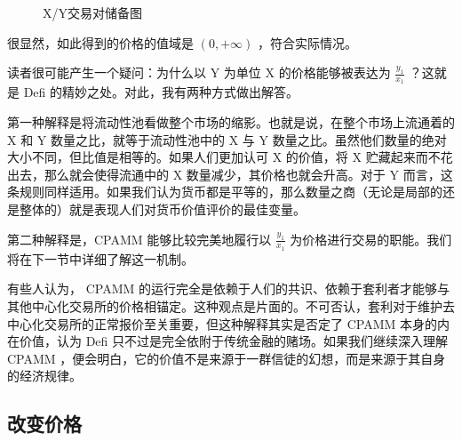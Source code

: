 \documentclass[12pt, a4paper, oneside]{ctexart}
\begin{document}
\begin{figure}[htbp]
    \centering
    \caption{X/Y交易对储备图}
\end{figure}

很显然，如此得到的价格的值域是 $(0,+\infty)$ ，符合实际情况。

读者很可能产生一个疑问：为什么以 Y 为单位 X 的价格能够被表达为 $\displaystyle \frac{y_1}{x_1}$ ？这就是 Defi 的精妙之处。对此，我有两种方式做出解答。

第一种解释是将流动性池看做整个市场的缩影。也就是说，在整个市场上流通着的 X 和 Y 数量之比，就等于流动性池中的 X 与 Y 数量之比。虽然他们数量的绝对大小不同，但比值是相等的。如果人们更加认可 X 的价值，将 X 贮藏起来而不花出去，那么就会使得流通中的 X 数量减少，其价格也就会升高。对于 Y 而言，这条规则同样适用。如果我们认为货币都是平等的，那么数量之商（无论是局部的还是整体的）就是表现人们对货币价值评价的最佳变量。

第二种解释是，CPAMM 能够比较完美地履行以 $\displaystyle \frac{y_1}{x_1}$ 为价格进行交易的职能。我们将在下一节中详细了解这一机制。

有些人认为， CPAMM 的运行完全是依赖于人们的共识、依赖于套利者才能够与其他中心化交易所的价格相锚定。这种观点是片面的。不可否认，套利对于维护去中心化交易所的正常报价至关重要，但这种解释其实是否定了 CPAMM 本身的内在价值，认为 Defi 只不过是完全依附于传统金融的赌场。如果我们继续深入理解 CPAMM ，便会明白，它的价值不是来源于一群信徒的幻想，而是来源于其自身的经济规律。

\subsection{改变价格}
\end{document}
